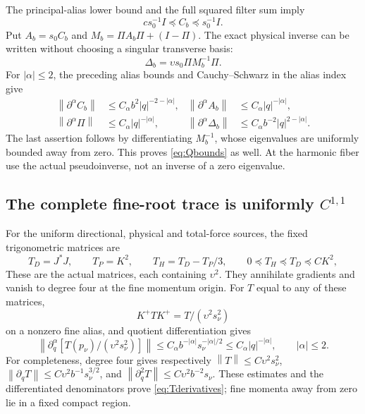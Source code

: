 \documentclass[11pt,letterpaper]{article}
\theoremstyle{remark}\newtheorem{remark}[theorem]{Remark}
\newcommand{\norm}[1]{\left\lVert#1\right\rVert}
\begin{document}
The principal-alias lower bound and the full squared filter sum imply
\[
 c s_0^{-1}I\preceq C_b\preceq s_0^{-1}I.
\]
Put \(A_b=s_0C_b\) and \(M_b=\Pi A_b\Pi+(I-\Pi)\). The exact physical inverse can be written without choosing a singular transverse basis:
\begin{equation}\label{eq:quotientinverse}
 \boxed{\quad \Delta_b=\upsilon s_0\Pi M_b^{-1}\Pi.\quad}
\end{equation}
For \(|\alpha|\le2\), the preceding alias bounds and Cauchy--Schwarz in the alias index give
\begin{align}\label{eq:derivatives}
 \norm{\partial^\alpha C_b}&\le C_\alpha b^2|q|^{-2-|\alpha|},
 &\norm{\partial^\alpha A_b}&\le C_\alpha|q|^{-|\alpha|},\\
 \norm{\partial^\alpha\Pi}&\le C_\alpha|q|^{-|\alpha|},
 &\norm{\partial^\alpha\Delta_b}&\le C_\alpha b^{-2}|q|^{2-|\alpha|}.
 \nonumber
\end{align}
The last assertion follows by differentiating \(M_b^{-1}\), whose eigenvalues are uniformly bounded away from zero. This proves \eqref{eq:Qbounds} as well. At the harmonic fiber use the actual pseudoinverse, not an inverse of a zero eigenvalue.

\subsection{The complete fine-root trace is uniformly \texorpdfstring{\(C^{1,1}\)}{C1,1}}

For the uniform directional, physical and total-force sources, the fixed trigonometric matrices are
\[
 T_D=J^*J,\qquad T_P=K^2,\qquad T_H=T_D-T_P/3,
 \qquad 0\preceq T_H\preceq T_D\preceq CK^2,
\]
These are the actual matrices, each containing \(\upsilon^2\). They annihilate gradients and vanish to degree four at the fine momentum origin. For \(T\) equal to any of these matrices,
\[
 K^+TK^+=T/(\upsilon^2s_\nu^2)
\]
on a nonzero fine alias, and quotient differentiation gives
\begin{equation}\label{eq:Tderivatives}
 \norm{\partial_q^\alpha[T(p_\nu)/(\upsilon^2s_\nu^2)]}
 \le C_\alpha b^{-|\alpha|}s_\nu^{-|\alpha|/2}
 \le C_\alpha|q|^{-|\alpha|},\qquad |\alpha|\le2.
\end{equation}
For completeness, degree four gives respectively
\(\norm T\le C\upsilon^2s_\nu^2\),
\(\norm{\partial_qT}\le C\upsilon^2b^{-1}s_\nu^{3/2}\), and
\(\norm{\partial_q^2T}\le C\upsilon^2b^{-2}s_\nu\). These estimates and the differentiated denominators prove \eqref{eq:Tderivatives}; fine momenta away from zero lie in a fixed compact region.
\end{document}
